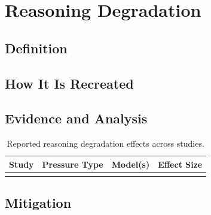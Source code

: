 \section{Reasoning Degradation}
\label{sec:reasoning_degradation}

\subsection{Definition}
\label{sec:reasoning_degradation_definition}

\subsection{How It Is Recreated}
\label{sec:reasoning_degradation_elicitation}

\subsection{Evidence and Analysis}
\label{sec:reasoning_degradation_evidence}

\begin{table}[t]
\centering
\caption{Reported reasoning degradation effects across studies.}
\label{tab:reasoning_degradation_evidence}
\begin{tabular}{llll}
\toprule
\textbf{Study} & \textbf{Pressure Type} & \textbf{Model(s)} & \textbf{Effect Size} \\
\midrule
 & & & \\
\bottomrule
\end{tabular}
\end{table}

\subsection{Mitigation}
\label{sec:reasoning_degradation_mitigation}
